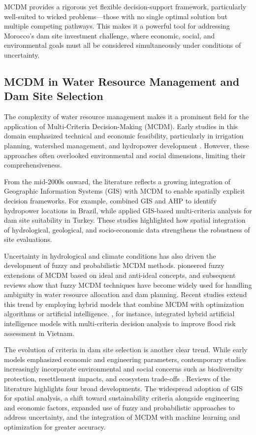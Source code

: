 MCDM provides a rigorous yet flexible decision-support framework, particularly well-suited to wicked problems—those with no single optimal solution but multiple competing pathways. This makes it a powerful tool for addressing Morocco's dam site investment challenge, where economic, social, and environmental goals must all be considered simultaneously under conditions of uncertainty.

\subsection{MCDM in Water Resource Management and Dam Site Selection}
The complexity of water resource management makes it a prominent field for the application of Multi-Criteria Decision-Making (MCDM). Early studies in this domain emphasized technical and economic feasibility, particularly in irrigation planning, watershed management, and hydropower development \cite{POHEKAR2004,Romanelli2018}. However, these approaches often overlooked environmental and social dimensions, limiting their comprehensiveness.

From the mid-2000s onward, the literature reflects a growing integration of Geographic Information Systems (GIS) with MCDM to enable spatially explicit decision frameworks. For example, \cite{Romanelli2018} combined GIS and AHP to identify hydropower locations in Brazil, while \cite{karakus2022} applied GIS-based multi-criteria analysis for dam site suitability in Turkey. These studies highlighted how spatial integration of hydrological, geological, and socio-economic data strengthens the robustness of site evaluations.

Uncertainty in hydrological and climate conditions has also driven the development of fuzzy and probabilistic MCDM methods. \cite{LIANG1999} pioneered fuzzy extensions of MCDM based on ideal and anti-ideal concepts, and subsequent reviews \cite{Mardani2015} show that fuzzy MCDM techniques have become widely used for handling ambiguity in water resource allocation and dam planning. Recent studies extend this trend by employing hybrid models that combine MCDM with optimization algorithms or artificial intelligence. \cite{PHAM2021}, for instance, integrated hybrid artificial intelligence models with multi-criteria decision analysis to improve flood risk assessment in Vietnam.

The evolution of criteria in dam site selection is another clear trend. While early models emphasized economic and engineering parameters, contemporary studies increasingly incorporate environmental and social concerns such as biodiversity protection, resettlement impacts, and ecosystem trade-offs \cite{Dirie2024,karakus2022}. Reviews of the literature highlights four broad developments. The widespread adoption of GIS for spatial analysis, a shift toward sustainability criteria alongside engineering and economic factors, expanded use of fuzzy and probabilistic approaches to address uncertainty, and the integration of MCDM with machine learning and optimization for greater accuracy.


